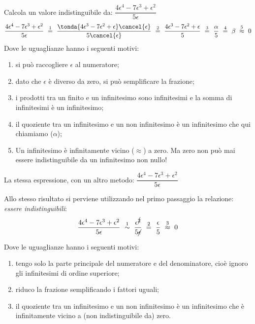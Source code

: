 \begin{esempio}
Calcola un valore indistinguibile da:
\(\dfrac{4 \epsilon^4 -7 \epsilon^3 + \epsilon^2}{5 \epsilon}\)
\[\dfrac{4 \epsilon^4 -7 \epsilon^3 + \epsilon^2}{5 \epsilon} 
~ \stackrel{1}{=} ~
  \dfrac{\tonda{4 \epsilon^3 -7 \epsilon^2 + \epsilon} \cancel{\epsilon}}
                    {5 \cancel{\epsilon}} 
~ \stackrel{2}{=} ~ 
  \dfrac{4 \epsilon^3 -7 \epsilon^2 + \epsilon}{5}
~ \stackrel{3}{=} ~
  \dfrac{\alpha}{5}
~ \stackrel{4}{=} ~
  \beta
~ \stackrel{5}{\approx} ~
  0\]
Dove le uguaglianze hanno i seguenti motivi:
\begin{enumerate} [nosep]
 \item si può raccogliere \(\epsilon\) al numeratore; 
 \item dato che \(\epsilon\) è diverso da zero, si può semplificare la 
frazione; 
 \item i prodotti tra un finito e un infinitesimo sono infinitesimi e la 
somma di infinitesimi è un infinitesimo;
 \item il quoziente tra un infinitesimo e un non infinitesimo è un 
infinitesimo che qui chiamiamo (\(\alpha\));
 \item Un infinitesimo è infinitamente vicino (\(\approx\)) a zero. 
Ma zero non può mai essere indistinguibile da un infinitesimo non nullo!
\end{enumerate}
\end{esempio}

\begin{esempio}
La stessa espressione, con un altro metodo:
\(\dfrac{4 \epsilon^4 -7 \epsilon^3 + \epsilon^2}{5 \epsilon}\)

Allo stesso risultato si perviene utilizzando nel primo passaggio la 
relazione: \emph{essere indistinguibili}:
\[\dfrac{4 \epsilon^4 -7 \epsilon^3 + \epsilon^2}{5 \epsilon} 
~ \stackrel{1}{\sim} ~
  \dfrac{\epsilon^{\cancel{2}}}{5 \cancel{\epsilon}} 
~ \stackrel{2}{=} ~
  \dfrac{\epsilon}{5}
~ \stackrel{3}{\approx} ~
  0\]

Dove le uguaglianze hanno i seguenti motivi:
\begin{enumerate} [nosep]
 \item tengo solo la parte principale del numeratore e del denominatore, 
cioè ignoro gli infinitesimi di ordine superiore; 
 \item riduco la frazione semplificando i fattori uguali; 
 \item il quoziente tra un infinitesimo e un non infinitesimo è un 
infinitesimo che è infinitamente vicino a (non indistinguibile da) zero.
\end{enumerate}
\end{esempio}

